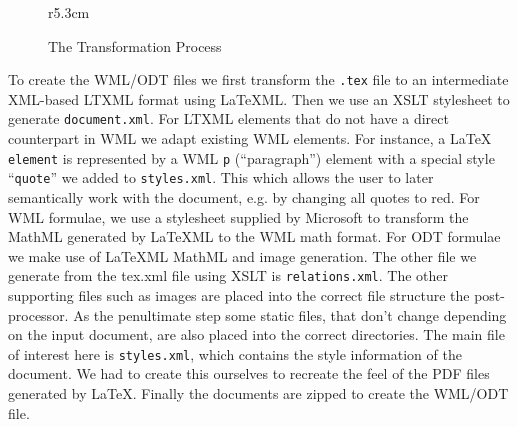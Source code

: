 \documentclass{llncs}
\def\latexml{{\LaTeX}ML\xspace}
\begin{document}
\begin{figure}r{5.3cm}\scriptsize\vspace*{-2em}
\caption{The Transformation Process}\label{fig:arch}\vspace*{-1em}
\end{figure}
To create the WML/ODT files we first transform the \texttt{.tex} file to an intermediate
XML-based \textsf{LTXML} format using \latexml. Then we use an XSLT stylesheet to generate
\texttt{document.xml}. For \textsf{LTXML} elements that do not have a direct counterpart
in WML we adapt existing WML elements. For instance, a {\LaTeX} \texttt{element} is
represented by a WML \texttt{p} (``paragraph'') element with a special style
``\texttt{quote}'' we added to \texttt{styles.xml}. This which allows the user to later
semantically work with the document, e.g. by changing all quotes to red.  For WML
formulae, we use a stylesheet supplied by Microsoft to transform the MathML generated by \latexml to
the WML math format. For ODT formulae we make use of \latexml MathML and image generation.
The other file we generate from the tex.xml file using XSLT is \texttt{relations.xml}. The
other supporting files such as images are placed into the correct file structure the
post-processor. As the penultimate step some static files, that don't change depending on
the input document, are also placed into the correct directories. The main file of
interest here is \texttt{styles.xml}, which contains the style information of the
document. We had to create this ourselves to recreate the feel of the PDF files generated
by {\LaTeX}. Finally the documents are zipped to create the WML/ODT file.
\end{document}
